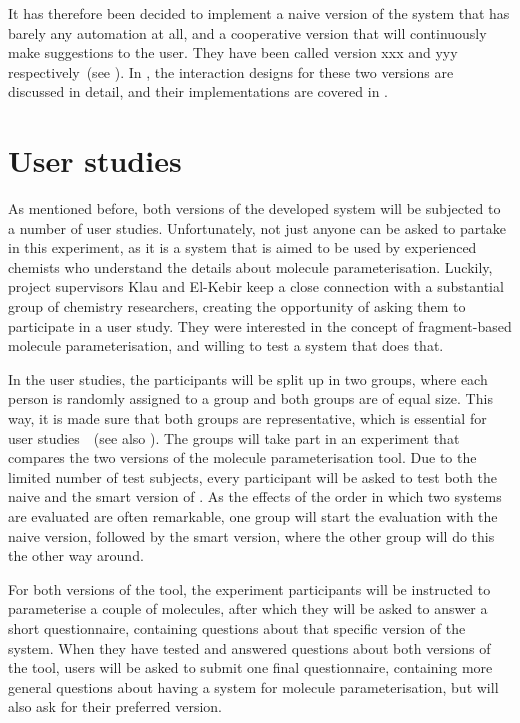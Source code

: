 It has therefore been decided to implement a naive version of the system that has barely any automation at all, and a cooperative version that will continuously make suggestions to the user. They have been called version xxx and yyy respectively~(see ). In , the interaction designs for these two versions are discussed in detail, and their implementations are covered in .



\section{User studies}
As mentioned before, both versions of the developed system will be subjected to a number of user studies. Unfortunately, not just anyone can be asked to partake in this experiment, as it is a system that is aimed to be used by experienced chemists who understand the details about molecule parameterisation. Luckily, project supervisors Klau and El-Kebir keep a close connection with a substantial group of chemistry researchers, creating the opportunity of asking them to participate in a user study. They were interested in the concept of fragment-based molecule parameterisation, and willing to test a system that does that.

In the user studies, the participants will be split up in two groups, where each person is randomly assigned to a group and both groups are of equal size. This way, it is made sure that both groups are representative, which is essential for user studies~\cite{wohlin2003empirical}~(see also ). The groups will take part in an experiment that compares the two versions of the molecule parameterisation tool. Due to the limited number of test subjects, every participant will be asked to test both the naive and the smart version of \oframp. As the effects of the order in which two systems are evaluated are often remarkable, one group will start the evaluation with the naive version, followed by the smart version, where the other group will do this the other way around.

For both versions of the tool, the experiment participants will be instructed to parameterise a couple of molecules, after which they will be asked to answer a short questionnaire, containing questions about that specific version of the system. When they have tested and answered questions about both versions of the tool, users will be asked to submit one final questionnaire, containing more general questions about having a system for molecule parameterisation, but will also ask for their preferred version.

